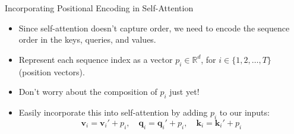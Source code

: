 \documentclass[serif, aspectratio=169]{beamer}
\begin{document}
\begin{frame}{Incorporating Positional Encoding in Self-Attention}
	\begin{itemize}
		\item Since self-attention doesn’t capture order, we need to encode the sequence order in the keys, queries, and values.
		\item Represent each sequence index as a vector \( p_i \in \mathbb{R}^d \), for \( i \in \{1, 2, \dots, T\} \) (position vectors).
		\item Don’t worry about the composition of \( p_i \) just yet!
		\item Easily incorporate this into self-attention by adding \( p_i \) to our inputs:
		\begin{equation*}
			\mathbf{v}_i = \mathbf{v}_i' + p_i, \quad \mathbf{q}_i = \mathbf{q}_i' + p_i, \quad \mathbf{k}_i = \mathbf{k}_i' + p_i
		\end{equation*}
	\end{itemize}
\end{frame}

%
\end{document}
